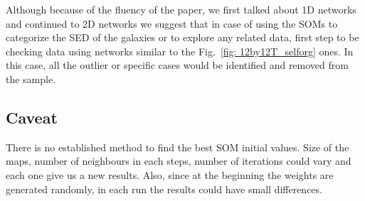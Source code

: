     Although because of the fluency of the paper, we first talked about 1D networks and continued to 2D networks we suggest that in case of using the SOMs to categorize the SED of the galaxies or to explore any related data, first step to be checking data using networks similar to the Fig.~\ref{fig: 12by12T_selforg} ones.
    In this case, all the outlier or specific cases would be identified and removed from the sample. 

    
    \subsection{Caveat}
    There is no established method to find the best SOM initial values. 
    Size of the maps, number of neighbours in each steps, number of iterations could vary and each one give us a new results.
    Also, since at the beginning the weights are generated randomly, in each run the results could have small differences.
    
    